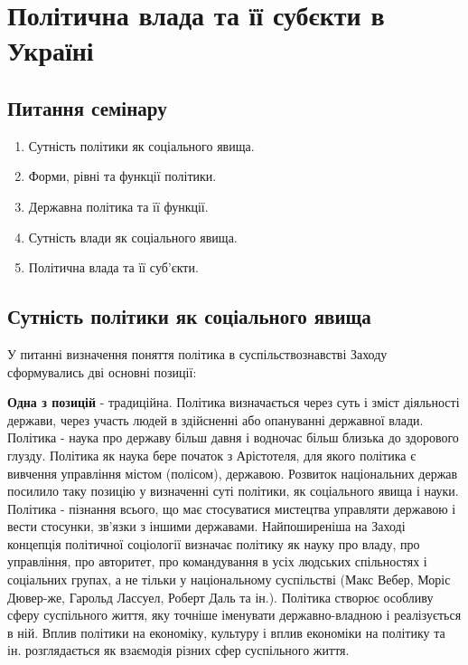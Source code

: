 \section{Політична влада та її субєкти в Україні} 
\subsection{Питання семінару}
\begin{enumerate}
\item Сутність політики як соціального явища.
\item Форми, рівні та функції політики.
\item Державна політика та її функції.
\item Сутність влади як соціального явища.
\item Політична влада та її суб’єкти.
\end{enumerate}
\subsection{Сутність політики як соціального явища}
У питанні визначення поняття політика в суспільствознавстві Заходу сформувались дві основні позиції:

\textbf{Одна з позицій} - традиційна. Політика визначається через суть і зміст діяльності держави, через участь людей в здійсненні або опануванні державної влади. Політика - наука про державу більш давня і водночас більш близька до здорового глузду. Політика як наука бере початок з Арістотеля, для якого політика є вивчення управління містом (полісом), державою. Розвиток національних держав посилило таку позицію у визначенні суті політики, як соціального явища і науки. Політика - пізнання всього, що має стосуватися мистецтва управляти державою і вести стосунки, зв'язки з іншими державами. Найпоширеніша на Заході концепція політичної соціології визначає політику як науку про владу, про управління, про авторитет, про командування в усіх людських спільностях і соціальних групах, а не тільки у національному суспільстві (Макс Вебер, Моріс Дювер-же, Гарольд Лассуел, Роберт Даль та ін.). Політика створює особливу сферу суспільного життя, яку точніше іменувати державно-владною і реалізується в ній. Вплив політики на економіку, культуру і вплив економіки на політику та ін. розглядається як взаємодія різних сфер суспільного життя.

